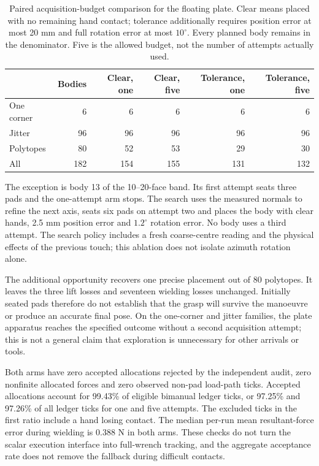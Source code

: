 \begin{table}[htbp]\centering\small
\begin{tabular}{@{}lrrrrr@{}}\toprule
 & Bodies & Clear, one & Clear, five & Tolerance, one & Tolerance, five\\
\midrule
One corner & 6 & 6 & 6 & 6 & 6\\
Jitter & 96 & 96 & 96 & 96 & 96\\
Polytopes & 80 & 52 & 53 & 29 & 30\\
All & 182 & 154 & 155 & 131 & 132\\
\bottomrule\end{tabular}
\caption{Paired acquisition-budget comparison for the floating plate. Clear means placed with no remaining hand contact; tolerance additionally requires position error at most 20 mm and full rotation error at most $10^\circ$. Every planned body remains in the denominator. Five is the allowed budget, not the number of attempts actually used.}
\label{tab:plate-search}
\end{table}

The exception is body 13 of the 10--20-face band. Its first attempt seats three pads and the one-attempt arm stops. The search uses the measured normals to refine the next axis, seats six pads on attempt two and places the body with clear hands, 2.5 mm position error and $1.2^\circ$ rotation error. No body uses a third attempt. The search policy includes a fresh coarse-centre reading and the physical effects of the previous touch; this ablation does not isolate azimuth rotation alone.

The additional opportunity recovers one precise placement out of 80 polytopes. It leaves the three lift losses and seventeen wielding losses unchanged. Initially seated pads therefore do not establish that the grasp will survive the manoeuvre or produce an accurate final pose. On the one-corner and jitter families, the plate apparatus reaches the specified outcome without a second acquisition attempt; this is not a general claim that exploration is unnecessary for other arrivals or tools.

Both arms have zero accepted allocations rejected by the independent audit, zero nonfinite allocated forces and zero observed non-pad load-path ticks. Accepted allocations account for 99.43\% of eligible bimanual ledger ticks, or 97.25\% and 97.26\% of all ledger ticks for one and five attempts. The excluded ticks in the first ratio include a hand losing contact. The median per-run mean resultant-force error during wielding is 0.388 N in both arms. These checks do not turn the scalar execution interface into full-wrench tracking, and the aggregate acceptance rate does not remove the fallback during difficult contacts.

